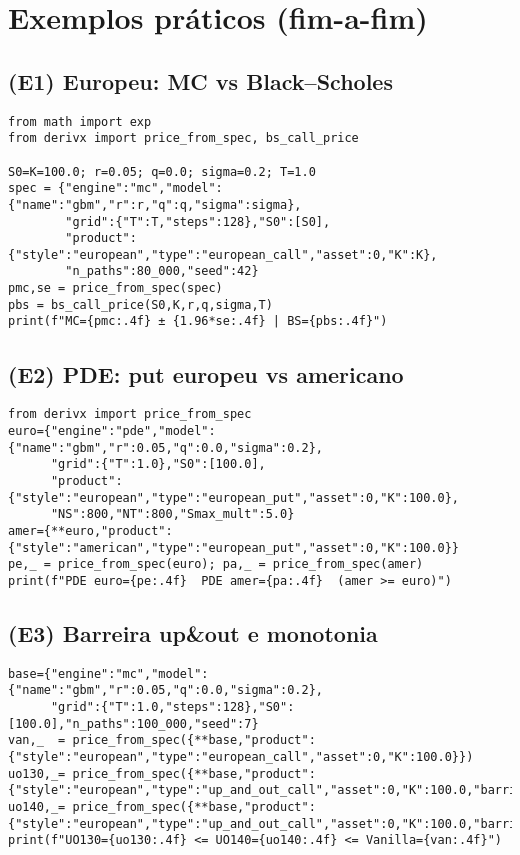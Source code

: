 \documentclass[11pt,a4paper]{article}
\begin{document}
\section{Exemplos práticos (fim-a-fim)}

\subsection{(E1) Europeu: MC vs Black--Scholes}
\begin{lstlisting}[style=pystyle]
from math import exp
from derivx import price_from_spec, bs_call_price

S0=K=100.0; r=0.05; q=0.0; sigma=0.2; T=1.0
spec = {"engine":"mc","model":{"name":"gbm","r":r,"q":q,"sigma":sigma},
        "grid":{"T":T,"steps":128},"S0":[S0],
        "product":{"style":"european","type":"european_call","asset":0,"K":K},
        "n_paths":80_000,"seed":42}
pmc,se = price_from_spec(spec)
pbs = bs_call_price(S0,K,r,q,sigma,T)
print(f"MC={pmc:.4f} ± {1.96*se:.4f} | BS={pbs:.4f}")
\end{lstlisting}

\subsection{(E2) PDE: put europeu vs americano}
\begin{lstlisting}[style=pystyle]
from derivx import price_from_spec
euro={"engine":"pde","model":{"name":"gbm","r":0.05,"q":0.0,"sigma":0.2},
      "grid":{"T":1.0},"S0":[100.0],
      "product":{"style":"european","type":"european_put","asset":0,"K":100.0},
      "NS":800,"NT":800,"Smax_mult":5.0}
amer={**euro,"product":{"style":"american","type":"european_put","asset":0,"K":100.0}}
pe,_ = price_from_spec(euro); pa,_ = price_from_spec(amer)
print(f"PDE euro={pe:.4f}  PDE amer={pa:.4f}  (amer >= euro)")
\end{lstlisting}

\subsection{(E3) Barreira up\&out e monotonia}
\begin{lstlisting}[style=pystyle]
base={"engine":"mc","model":{"name":"gbm","r":0.05,"q":0.0,"sigma":0.2},
      "grid":{"T":1.0,"steps":128},"S0":[100.0],"n_paths":100_000,"seed":7}
van,_  = price_from_spec({**base,"product":{"style":"european","type":"european_call","asset":0,"K":100.0}})
uo130,_= price_from_spec({**base,"product":{"style":"european","type":"up_and_out_call","asset":0,"K":100.0,"barrier":130.0}})
uo140,_= price_from_spec({**base,"product":{"style":"european","type":"up_and_out_call","asset":0,"K":100.0,"barrier":140.0}})
print(f"UO130={uo130:.4f} <= UO140={uo140:.4f} <= Vanilla={van:.4f}")
\end{lstlisting}
\end{document}

